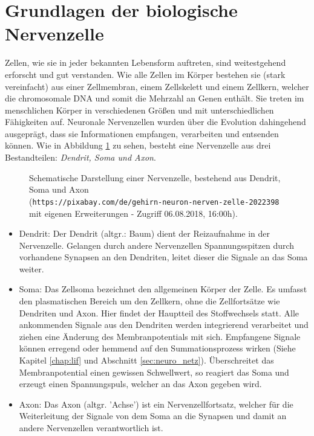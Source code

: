 \section{Grundlagen der biologische Nervenzelle}
\label{sec:neuro_nervenzelle}
	Zellen, wie sie in jeder bekannten Lebensform auftreten, sind weitestgehend erforscht und gut verstanden. Wie alle Zellen im Körper bestehen sie (stark vereinfacht) aus einer Zellmembran, einem Zellskelett und einem Zellkern, welcher die chromosomale DNA und somit die Mehrzahl an Genen enthält. Sie treten im menschlichen Körper in verschiedenen Größen und mit unterschiedlichen Fähigkeiten auf. Neuronale Nervenzellen wurden über die Evolution dahingehend ausgeprägt, dass sie Informationen empfangen, verarbeiten und entsenden können. Wie in Abbildung \ref{fig:neuron} zu sehen, besteht eine Nervenzelle aus drei Bestandteilen: \textit{Dendrit, Soma und Axon}.
	\begin{figure}[H] %
		\centering
		\def\svgwidth{12cm}
		
		\caption{Schematische Darstellung einer Nervenzelle, bestehend aus Dendrit, Soma und Axon\\(\texttt{https://pixabay.com/de/gehirn-neuron-nerven-zelle-2022398} mit eigenen Erweiterungen - Zugriff 06.08.2018, 16:00h).}
		\label{fig:neuron}
	\end{figure}
	\begin{itemize}
		\item Dendrit:
			\subitem Der Dendrit (altgr.: \glqq Baum\grqq) dient der Reizaufnahme in der Nervenzelle. Gelangen durch andere Nervenzellen Spannungsspitzen durch vorhandene Synapsen an den Dendriten, leitet dieser die Signale an das Soma weiter.
		\item Soma:
			\subitem Das Zellsoma bezeichnet den allgemeinen Körper der Zelle. Es umfasst den plasmatischen Bereich um den Zellkern, ohne die Zellfortsätze wie Dendriten und Axon. Hier findet der Hauptteil des Stoffwechsels statt. Alle ankommenden Signale aus den Dendriten werden integrierend verarbeitet und ziehen eine Änderung des Membranpotentials mit sich. Empfangene Signale können erregend oder hemmend auf den Summationsprozess wirken (Siehe Kapitel \ref{chap:lif} und Abschnitt \ref{sec:neuro_netz}). Überschreitet das Membranpotential einen gewissen Schwellwert, so reagiert das Soma und erzeugt einen Spannungspuls, welcher an das Axon gegeben wird.
		\item Axon:
			\subitem Das Axon (altgr. 'Achse') ist ein Nervenzellfortsatz, welcher für die Weiterleitung der Signale von dem Soma an die Synapsen und damit an andere Nervenzellen verantwortlich ist.
	\end{itemize}
